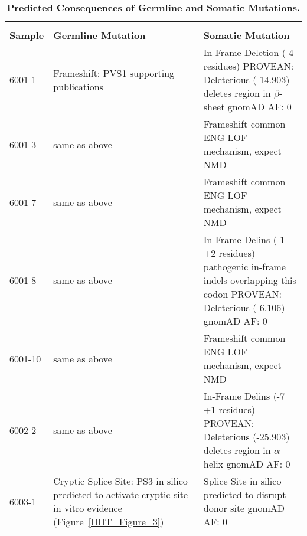 \begin{table}[]
\footnotesize
\renewcommand{\arraystretch}{1.7} 
\centering
\caption[Predicted Consequences of Germline and Somatic Mutations.]{\textbf{Predicted Consequences of Germline and Somatic Mutations.}}

\begin{tabularx}{\textwidth}{l p{4.4cm} X}
\multicolumn{3}{l}{} \\
\toprule
\textbf{Sample} & \textbf{Germline Mutation} & \textbf{Somatic Mutation} \\
\midrule
6001-1 & Frameshift: PVS1 \newline 6 supporting publications &In-Frame Deletion (-4 residues) \newline PROVEAN: Deleterious (-14.903) \newline deletes region in $\beta$-sheet \newline gnomAD AF: 0 \\\hline
6001-3 & same as above & Frameshift \newline common ENG LOF mechanism, expect NMD \\\hline
6001-7 & same as above & Frameshift \newline common ENG LOF mechanism, expect NMD \\\hline
6001-8 & same as above & In-Frame Delins (-1 +2 residues) \newline 2 pathogenic in-frame indels overlapping this codon \citep{shovlin1997, argyriou2006} \newline PROVEAN: Deleterious (-6.106) \newline gnomAD AF: 0 \\\hline
6001-10 & same as above & Frameshift \newline common ENG LOF mechanism, expect NMD \\\hline
6002-2 & same as above & In-Frame Delins (-7 +1 residues) \newline PROVEAN: Deleterious (-25.903) \newline deletes region in $\alpha$-helix \newline gnomAD AF: 0 \\\hline
6003-1 & Cryptic Splice Site: PS3 \newline in silico predicted to activate cryptic site \newline in vitro evidence (Figure~\ref{HHT_Figure_3}) & Splice Site \newline in silico predicted to disrupt donor site \newline gnomAD AF: 0 \\\hline

\end{tabularx}
\end{table}
